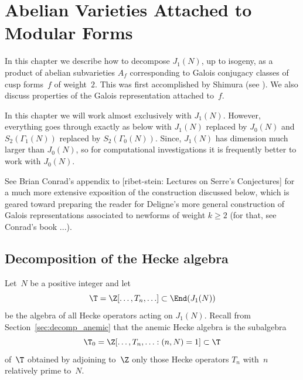 \documentclass{report}
\begin{document}
\chapter{Abelian Varieties Attached to Modular Forms}

In this chapter we describe how to decompose $J_1(N)$, up to
isogeny, as a product of abelian subvarieties $A_f$ corresponding
to Galois conjugacy classes of cusp forms~$f$ of weight~$2$.  This
was first accomplished by Shimura (see \cite[Theorem
7.14]{shimura:intro}). We also discuss properties of the Galois
representation attached to~$f$. 

In this chapter we will work almost exclusively with $J_1(N)$.  However,
everything goes through exactly as below with $J_1(N)$ replaced by
$J_0(N)$ and $S_2(\Gamma_1(N))$ replaced by $S_2(\Gamma_0(N))$.
Since,  $J_1(N)$ has dimension much larger
than $J_0(N)$, so for computational investigations it
is frequently better to work with $J_0(N)$.

See Brian Conrad's appendix to [ribet-stein: Lectures on Serre's
Conjectures] for a much more extensive exposition of the
construction discussed below, which is geared toward preparing the
reader for Deligne's more general construction of Galois
representations associated to newforms of weight $k\geq 2$ (for
that, see Conrad's book ...).

\section{Decomposition of the Hecke algebra}
Let~$N$ be a positive integer and let
\[
   \T=\Z[\ldots, T_n, \ldots]\subset\End(J_1(N))
\]
be the algebra of all Hecke operators acting on $J_1(N)$. Recall
from Section~\ref{sec:decomp_anemic} that the anemic Hecke algebra
is the subalgebra
\[
  \T_0=\Z[\ldots,T_n,\ldots:(n,N)=1]\subset\T
\]
of~$\T$ obtained by adjoining to~$\Z$ only those Hecke operators
$T_n$ with~$n$ relatively prime to~$N$.
\end{document}
